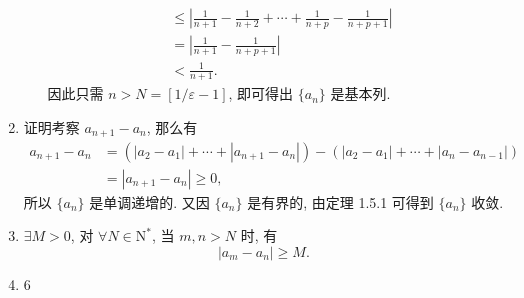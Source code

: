\begin{enumerate}
\begin{enumerate}[(1)]
\begin{align*}
                                    &\leqslant \left| \frac{1}{n+1} - \frac{1}{n+2} + \cdots + \frac{1}{n+p} - \frac{1}{n+p+1} \right| \\
                                    &= \left| \frac{1}{n+1} - \frac{1}{n+p+1} \right| \\
                                    &< \frac{1}{n+1}.
                \end{align*}
                因此只需 $n > N = [1/\varepsilon - 1]$, 即可得出 $\{a_n\}$ 是基本列.
        \end{enumerate}
    \item {\heiti 证明}\quad 考察 $a_{n+1} - a_n$, 那么有
        \begin{align*}
            a_{n+1} - a_n &= \left(|a_2-a_1| + \cdots + |a_{n+1}-a_n|\right) - \left(|a_2-a_1| + \cdots + |a_n-a_{n-1}|\right) \\
                          &= |a_{n+1}-a_n| \geqslant 0,
        \end{align*}
        所以 $\{a_n\}$ 是单调递增的. 又因 $\{a_n\}$ 是有界的, 由定理 1.5.1 可得到 $\{a_n\}$ 收敛.
    \item $\exists M > 0$, 对 $\forall N \in \mathrm{N}^*$, 当 $m, n > N$ 时, 有
        \[
            |a_m - a_n| \geqslant M.   
        \]
    \item 6
\end{enumerate}
% 
